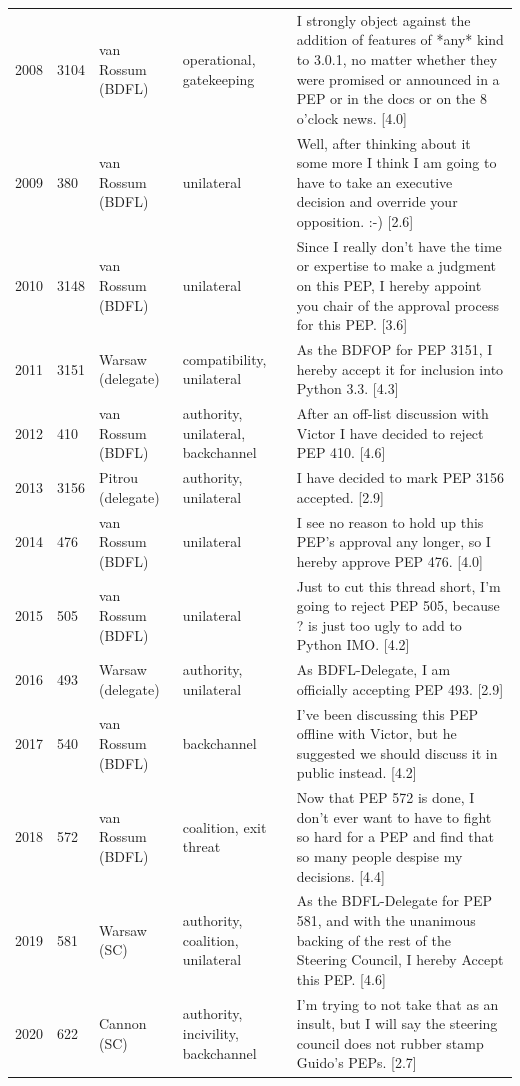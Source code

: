 \documentclass[sigconf,screen]{acmart}
\begin{document}
\begin{table}[t]
\begin{tabular}{p{}p{}p{}p{}p{}}
2008 & 3104 & van Rossum (BDFL) & operational, gatekeeping & I strongly object against the addition of features of *any* kind to 3.0.1, no matter whether they were promised or announced in a PEP or in the docs or on the 8 o'clock news. [4.0] \\
2009 & 380 & van Rossum (BDFL) & unilateral & Well, after thinking about it some more I think I am going to have to take an executive decision and override your opposition. :-) [2.6] \\
2010 & 3148 & van Rossum (BDFL) & unilateral & Since I really don't have the time or expertise to make a judgment on this PEP, I hereby appoint you chair of the approval process for this PEP. [3.6] \\
2011 & 3151 & Warsaw (delegate) & compatibility, unilateral & As the BDFOP for PEP 3151, I hereby accept it for inclusion into Python 3.3. [4.3] \\
2012 & 410 & van Rossum (BDFL) & authority, unilateral, backchannel & After an off-list discussion with Victor I have decided to reject PEP 410. [4.6] \\
2013 & 3156 & Pitrou (delegate) & authority, unilateral & I have decided to mark PEP 3156 accepted. [2.9] \\
2014 & 476 & van Rossum (BDFL) & unilateral & I see no reason to hold up this PEP's approval any longer, so I hereby approve PEP 476. [4.0] \\
2015 & 505 & van Rossum (BDFL) & unilateral & Just to cut this thread short, I'm going to reject PEP 505, because ? is just too ugly to add to Python IMO. [4.2] \\
2016 & 493 & Warsaw (delegate) & authority, unilateral & As BDFL-Delegate, I am officially accepting PEP 493. [2.9] \\
2017 & 540 & van Rossum (BDFL) & backchannel & I've been discussing this PEP offline with Victor, but he suggested we should discuss it in public instead. [4.2] \\
2018 & 572 & van Rossum (BDFL) & coalition, exit threat & Now that PEP 572 is done, I don't ever want to have to fight so hard for a PEP and find that so many people despise my decisions. [4.4] \\
2019 & 581 & Warsaw (SC) & authority, coalition, unilateral & As the BDFL-Delegate for PEP 581, and with the unanimous backing of the rest of the Steering Council, I hereby Accept this PEP. [4.6] \\
2020 & 622 & Cannon (SC) & authority, incivility, backchannel & I'm trying to not take that as an insult, but I will say the steering council does not rubber stamp Guido's PEPs. [2.7] \\

\end{tabular}
\end{table}
\end{document}
